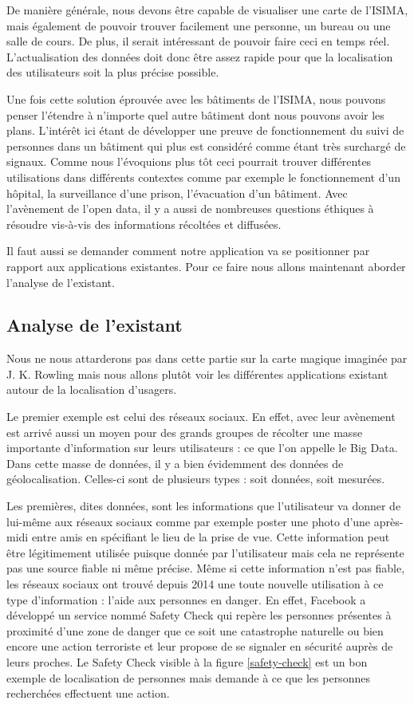 De manière générale, nous devons être capable de visualiser une carte de l'ISIMA, mais également de pouvoir trouver facilement une personne, un bureau ou une salle de cours. De plus, il serait intéressant de pouvoir faire ceci en temps réel. L'actualisation des données doit donc être assez rapide pour que la localisation des utilisateurs soit la plus précise possible.

Une fois cette solution éprouvée avec les bâtiments de l'ISIMA, nous pouvons penser l'étendre à n'importe quel autre bâtiment dont nous pouvons avoir les plans. L’intérêt ici étant de développer une preuve de fonctionnement du suivi de personnes dans un bâtiment qui plus est considéré comme étant très surchargé de signaux. Comme nous l’évoquions plus tôt ceci pourrait trouver différentes utilisations dans différents contextes comme par exemple le fonctionnement d’un hôpital, la surveillance d’une prison, l’évacuation d’un bâtiment. Avec l’avènement de l’open data, il y a aussi de nombreuses questions éthiques à résoudre vis-à-vis des informations récoltées et diffusées.

Il faut aussi se demander comment notre application va se positionner par rapport aux applications existantes. Pour ce faire nous allons maintenant aborder l’analyse de l’existant.


\subsection{Analyse de l'existant}

Nous ne nous attarderons pas dans cette partie sur la carte magique imaginée par J. K. Rowling mais nous allons plutôt voir les différentes applications existant autour de la localisation d’usagers.

Le premier exemple est celui des réseaux sociaux. En effet, avec leur avènement est arrivé aussi un moyen pour des grands groupes de récolter une masse importante d’information sur leurs utilisateurs : ce que l’on appelle le Big Data. Dans cette masse de données, il y a bien évidemment des données de géolocalisation. Celles-ci sont de plusieurs types : soit données, soit mesurées.

Les premières, dites données, sont les informations que l’utilisateur va donner de lui-même aux réseaux sociaux comme par exemple poster une photo d’une après-midi entre amis en spécifiant le lieu de la prise de vue. Cette information peut être légitimement utilisée puisque donnée par l’utilisateur mais cela ne représente pas une source fiable ni même précise. Même si cette information n’est pas fiable, les réseaux sociaux ont trouvé depuis 2014 une toute nouvelle utilisation à ce type d’information : l’aide aux personnes en danger. En effet, Facebook a développé un service nommé Safety Check \cite{fbsafetycheck} qui repère les personnes présentes à proximité d’une zone de danger que ce soit une catastrophe naturelle ou bien encore une action terroriste et leur propose de se signaler en sécurité auprès de leurs proches. Le Safety Check visible à la figure \ref{safety-check} est un bon exemple de localisation de personnes mais demande à ce que les personnes recherchées effectuent une action.

